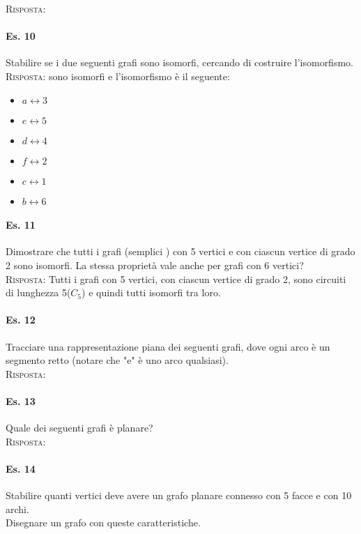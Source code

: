 \noindent
\textsc{Risposta:}

\paragraph{Es. 10} Stabilire se i due seguenti grafi sono isomorfi, cercando di costruire l'isomorfismo. \\

\noindent
\textsc{Risposta:} sono isomorfi e l'isomorfismo è il seguente: 
\begin{itemize}
    \item \( a \longleftrightarrow 3\)
    \item \(e \longleftrightarrow 5\)
    \item \( d \longleftrightarrow 4\)
    \item \( f \longleftrightarrow 2\)
    \item \(c \longleftrightarrow  1\)
    \item \(b \longleftrightarrow 6 \)
\end{itemize}

\paragraph{Es. 11} Dimostrare che tutti i grafi (semplici ) con 5 vertici e con ciascun vertice di grado 2 sono
isomorfi. La stessa proprietà vale anche per grafi con 6 vertici?\\

\noindent
\textsc{Risposta:} Tutti i grafi con 5 vertici, con ciascun vertice di grado 2, sono circuiti di lunghezza 5($C_5$) e quindi tutti isomorfi tra loro.

\paragraph{Es. 12} Tracciare una rappresentazione piana dei seguenti grafi, dove ogni arco è un segmento retto
(notare che "e" è uno arco qualsiasi).\\

\noindent
\textsc{Risposta:}

\paragraph{Es. 13} Quale dei seguenti grafi è planare?\\

\noindent
\textsc{Risposta:} 

\paragraph{Es. 14} Stabilire quanti vertici deve avere un grafo planare connesso con 5 facce e con 10 archi.\\
Disegnare un grafo con queste caratteristiche.\\

